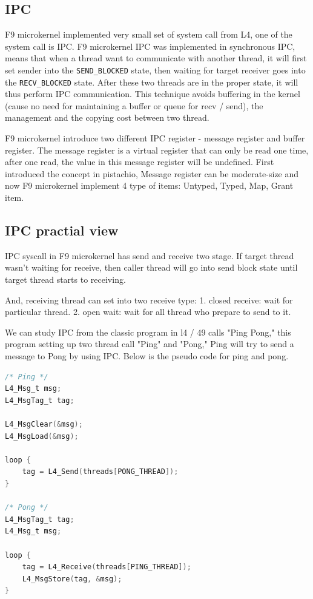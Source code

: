 \documentclass[10pt,preprint,nocopyrightspace]{sigplanconf}
\begin{document}
\subsection{IPC}

F9 microkernel implemented very small set of system call from L4, one of the system call is IPC\cite{dannowski2011l4, arm2016svc}. F9 microkernel IPC was implemented in synchronous IPC, means that when a thread want to communicate with another thread, it will first set sender into the \verb|SEND_BLOCKED| state, then waiting for target receiver goes into the \verb|RECV_BLOCKED| state. After these two threads are in the proper state, it will thus perform IPC communication. This technique avoids buffering in the kernel (cause no need for maintaining a buffer or queue for recv / send), the management and the copying cost between two thread.\cite{nourai2005aphysically}

F9 microkernel introduce two different IPC register - message register and buffer register. The message register is a virtual register that can only be read one time, after one read, the value in this message register will be undefined. First introduced the concept in pistachio\cite{nourai2005aphysically}, Message register can be moderate-size and now F9 microkernel implement 4 type of items: Untyped, Typed, Map, Grant item.

\subsection{IPC practial view}

IPC syscall in F9 microkernel has send and receive two stage. If target thread wasn't waiting for receive, then caller thread will go into send block state until target thread starts to receiving.

And, receiving thread can set into two receive type: 1. closed receive: wait for particular thread. 2. open wait: wait for all thread who prepare to send to it.

We can study IPC from the classic program in l4 / 49 calls "Ping Pong," this program setting up two thread call "Ping" and "Pong," Ping will try to send a message to Pong by using IPC. Below is the pseudo code for ping and pong.

\begin{lstlisting}[language=c,frame=single,basicstyle=\small]
/* Ping */
L4_Msg_t msg;
L4_MsgTag_t tag;

L4_MsgClear(&msg);
L4_MsgLoad(&msg);

loop {
    tag = L4_Send(threads[PONG_THREAD]);
}

/* Pong */
L4_MsgTag_t tag;
L4_Msg_t msg;

loop {
    tag = L4_Receive(threads[PING_THREAD]);
    L4_MsgStore(tag, &msg);
}
\end{lstlisting}
\end{document}
